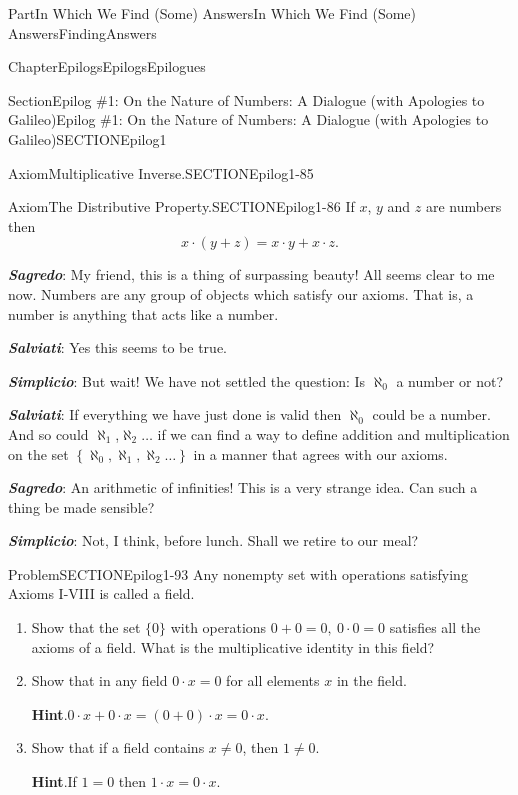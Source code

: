 \documentclass[oneside,10pt,]{book}
\newcommand{\blocktitlefont}{\relax}
\newcommand{\alert}[1]{\textbf{\textit{#1}}}
\numberwithin{equation}{part}
\begin{document}
\begin{partptx}{Part}{In Which We Find (Some) Answers}{}{In Which We Find (Some) Answers}{}{}{FindingAnswers}
\begin{chapterptx}{Chapter}{Epilogs}{}{Epilogs}{}{}{Epilogues}
\begin{sectionptx}{Section}{Epilog \#1: On the Nature of Numbers: A Dialogue (with Apologies to Galileo)}{}{Epilog \#1: On the Nature of Numbers: A Dialogue (with Apologies to Galileo)}{}{}{SECTIONEpilog1}
\begin{axiom}{Axiom}{Multiplicative Inverse.}{}{SECTIONEpilog1-85}
%
\end{axiom}
\begin{axiom}{Axiom}{The Distributive Property.}{}{SECTIONEpilog1-86}%
If \(x\), \(y\) and \(z\) are numbers then%
\begin{equation*}
x\cdot(y+z) = x\cdot y+x\cdot z\text{.}
\end{equation*}
%
\end{axiom}
\alert{Sagredo}: My friend, this is a thing of surpassing beauty!  All seems clear to me now.  Numbers are any group of objects which satisfy our axioms.  That is, a number is anything that acts like a number.%
\par
\alert{Salviati}:  Yes this seems to be true.%
\par
\alert{Simplicio}:  But wait! We have not settled the question: Is \(\aleph_0\) a number or not?%
\par
\alert{Salviati}: If everything we have just done is valid then \(\aleph_0\) could be a number.  And so could \(\aleph_1\),\(\aleph_2 \ldots\) if we can find a way to define addition and multiplication on the set \(\left\{\aleph_0,
\aleph_1, \aleph_2 \ldots\right\}\) in a manner that agrees with our axioms.%
\par
\alert{Sagredo}:  An arithmetic of infinities! This is a very strange idea. Can such a thing be made sensible?%
\par
\alert{Simplicio}:  Not, I think, before lunch. Shall we retire to our meal?%
\begin{problem}{Problem}{}{SECTIONEpilog1-93}%
Any non\textendash{}empty set with operations satisfying Axioms I-VIII is called a field.%
\begin{enumerate}[font=\bfseries,label=(\alph*),ref=\alph*]%
\item{}Show that the set \(\{0\}\) with operations \(0+0=0,\ 0\cdot 0=0\) satisfies all the axioms of a field. What is the multiplicative identity in this field?%
\item{}Show that in any field \(0\cdot x=0\) for all elements \(x\) in the field.%
\par\smallskip%
\noindent\textbf{\blocktitlefont Hint}.\hypertarget{SECTIONEpilog1-93-3-2}{}\quad{}\(0\cdot x+0\cdot x=\left(0+0\right)\cdot x=0\cdot x\).%
\item{}Show that if a field contains \(x\neq 0\), then \(1\neq 0\).%
\par\smallskip%
\noindent\textbf{\blocktitlefont Hint}.\hypertarget{SECTIONEpilog1-93-4-2}{}\quad{}If \(1=0\) then \(1\cdot x=0\cdot x\).%
\end{enumerate}%

\end{problem}
\end{sectionptx}
\end{chapterptx}
\end{partptx}
\end{document}
